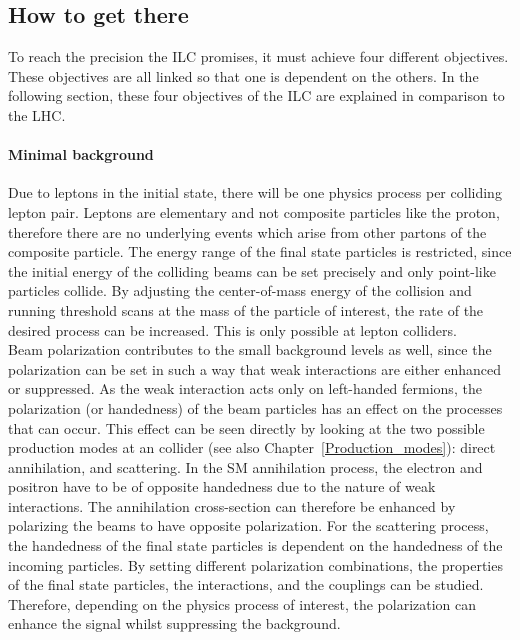 \subsection{How to get there}
To reach the precision the ILC promises, it must achieve four different objectives.
These objectives are all linked so that one is dependent on the others.
In the following section, these four objectives of the ILC are explained in comparison to the LHC.

\paragraph{Minimal background}
Due to leptons in the initial state, there will be one physics process per colliding lepton pair.
Leptons are elementary and not composite particles like the proton, therefore there are no underlying events which arise from other partons of the composite particle.
The energy range of the final state particles is restricted, since the initial energy of the colliding beams can be set precisely and only point-like particles collide.
By adjusting the center-of-mass energy of the collision and running threshold scans at the mass of the particle of interest, the rate of the desired process can be increased.
This is only possible at lepton colliders.
\\Beam polarization contributes to the small background levels as well, since the polarization can be set in such a way that weak interactions are either enhanced or suppressed.
As the weak interaction acts only on left-handed fermions, the polarization (or handedness) of the beam particles has an effect on the processes that can occur.
This effect can be seen directly by looking at the two possible production modes at an \positron\electron collider (see also Chapter~\ref{Production_modes}):
direct \positron\electron annihilation, and \positron\electron scattering.
In the SM annihilation process, the electron and positron have to be of opposite handedness due to the nature of weak interactions.
The annihilation cross-section can therefore be enhanced by polarizing the beams to have opposite polarization.
For the \positron\electron scattering process, the handedness of the final state particles is dependent on the handedness of the incoming particles.
By setting different polarization combinations, the properties of the final state particles, the interactions, and the couplings can be studied. %
Therefore, depending on the physics process of interest, the polarization can enhance the signal whilst suppressing the background. 
